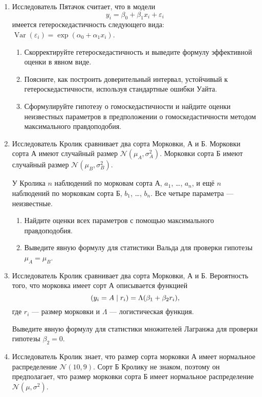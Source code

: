 \documentclass[12pt]{article} %
\theoremstyle{definition} %
\DeclareMathOperator{\Var}{Var}
\def \cN{\mathcal{N}}
\let\P\relax
\DeclareMathOperator{\P}{\mathbb{P}}
\begin{document}
\begin{enumerate}
\item Исследователь Пятачок считает, что в модели 
\[
y_i = \beta_0 + \beta_1 x_i + \varepsilon_i
\]
имеется гетероскедастичность следующего вида: $\Var(\varepsilon_i) = \exp(\alpha_0 + \alpha_1 x_i)$.

\begin{enumerate}
	\item Скорректируйте гетероскедастичность и выведите формулу эффективной оценки в явном виде. 
	\item Поясните, как построить доверительный интервал, устойчивый к гетероскедастичности, используя стандартные ошибки Уайта.
	\item Сформулируйте гипотезу о гомоскедастичности и найдите оценки неизвестных параметров в предположении о гомоскедастичности методом максимального правдоподобия.
\end{enumerate}


\newpage



\item Исследователь Кролик сравнивает два сорта Морковки, А и Б. Морковки сорта А имеют случайный размер $\cN(\mu_A, \sigma^2_A)$.
Морковки сорта Б имеют случайный размер $\cN(\mu_B, \sigma^2_B)$.

У Кролика $n$ наблюдений по морковам сорта А, $a_1$, \ldots, $a_n$, и ещё $n$ наблюдений по морковкам сорта Б, $b_1$, \ldots, $b_n$.
Все четыре параметра — неизвестные.

\begin{enumerate}
    \item Найдите оценки всех параметров с помощью максимального правдоподобия. 
    \item Выведите явную формулу для статистики Вальда для проверки гипотезы $\mu_A = \mu_B$.
\end{enumerate}


\item Исследователь Кролик сравнивает два сорта Морковки, А и Б. Вероятность того, что морковка имеет сорт А описывается функцией
\[
\P(y_i = A \mid r_i ) = \Lambda(\beta_1 + \beta_2 r_i),    
\]
где $r_i$ — размер морковки и $\Lambda$ — логистическая функция.

Выведите явную формулу для статистики множителей Лагранжа для проверки гипотезы $\beta_2 = 0$.



\item Исследователь Кролик знает, что размер сорта морковки А имеет нормальное распределение $\cN(10, 9)$.
Сорт Б Кролику не знаком, поэтому он предполагает, что размер морковки сорта Б имеет нормальное распределение $\cN(\mu, \sigma^2)$.


\end{enumerate}
\end{document}
